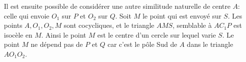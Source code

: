 \begin{sol}
\medskip

Il est ensuite possible de considérer une autre similitude naturelle de centre $A$: celle qui envoie $O_1$ sur $P$ et $O_2$ sur $Q$. Soit $M$ le point qui est envoyé sur $S$. Les points $A,O_1,O_2,M$ sont cocycliques, et le triangle $AMS$, semblable à $AC_1P$ est isocèle en $M$. Ainsi le point $M$ est le centre d'un cercle sur lequel varie $S$. Le point $M$ ne dépend pas de $P$ et $Q$ car c'est le pôle Sud de $A$ dans le triangle $AO_1O_2$.
\end{sol}